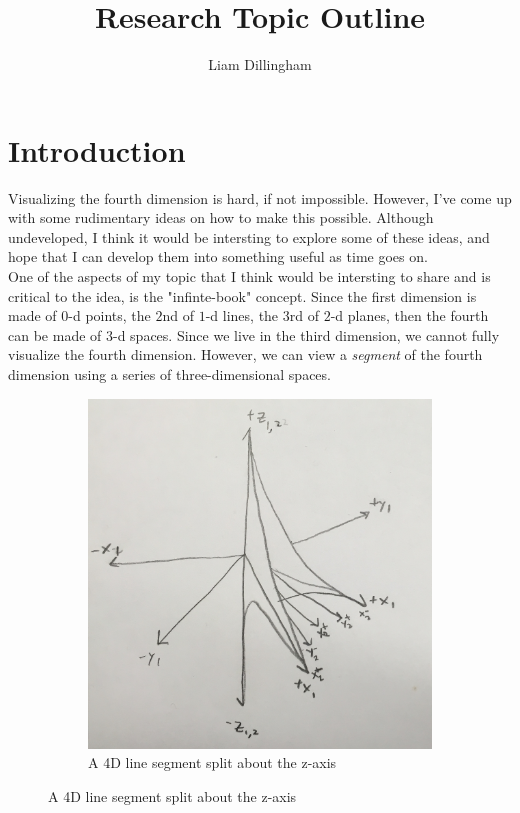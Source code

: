 \documentclass[20pt]{article} %
\title{Research Topic Outline}
\author{Liam Dillingham}
\begin{document}
\maketitle

\section{Introduction}
Visualizing the fourth dimension is hard, if not impossible.  However, I've come up with some rudimentary ideas on how to make this possible.  Although undeveloped, I think it would be intersting to explore some of these ideas, and hope that I can develop them into something useful as time goes on. \\ 

One of the aspects of my topic that I think would be intersting to share and is critical to the idea, is the "infinte-book" concept.  Since the first dimension is made of $0$-d points, the $2$nd of $1$-d lines, the $3$rd of $2$-d planes, then the fourth can be made of $3$-d spaces.  Since we live in the third dimension, we cannot fully visualize the fourth dimension. However, we can view a \textit{segment} of the fourth dimension using a series of three-dimensional spaces.

\begin{figure}[!htbp]
  	\centering
   	\begin{subfigure}[p]{0.5\linewidth}
    	\includegraphics[width=\linewidth]{./figures/fig1.jpg}
	\caption{A 4D line segment split about the z-axis}
	\label{fig:sub1}
   	\end{subfigure}
\end{figure} 
\end{document}
